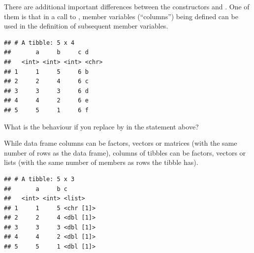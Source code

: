 \documentclass[krantz2]{krantz}\usepackage{knitr}%
\begin{document}
There are additional important differences between the constructors  and . One of them is that in a call to , member variables (``columns'')  being defined can be used in the definition of subsequent member variables.
\begin{knitrout}\footnotesize
{}\color{fgcolor}\begin{kframe}
\begin{alltt}
\hlstd{(} \hlstd{=} \hlopt{:}\hlstd{,}  \hlstd{=} \hlopt{:}\hlstd{,}   \hlopt{+}   \hlstd{= letters[a} \hlopt{+} \hlstd{])}
\end{alltt}
\begin{verbatim}
## # A tibble: 5 x 4
##       a     b     c d    
##   <int> <int> <int> <chr>
## 1     1     5     6 b    
## 2     2     4     6 c    
## 3     3     3     6 d    
## 4     4     2     6 e    
## 5     5     1     6 f
\end{verbatim}
\end{kframe}
\end{knitrout}

\begin{playground}
What is the behaviour if you replace  by  in the statement above?
\end{playground}

While data frame columns can be factors, vectors or matrices (with the same number of rows as the data frame), columns of tibbles can be factors, vectors or lists (with the same number of members as rows the tibble has).
\begin{knitrout}\footnotesize
{}\color{fgcolor}\begin{kframe}
\begin{alltt}
\hlstd{(} \hlstd{=} \hlopt{:}\hlstd{,}  \hlstd{=} \hlopt{:}\hlstd{,}  \hlstd{=} \hlstd{(}\hlstd{,} \hlstd{,} \hlstd{,} \hlstd{,} \hlstd{))}
\end{alltt}
\begin{verbatim}
## # A tibble: 5 x 3
##       a     b c        
##   <int> <int> <list>   
## 1     1     5 <chr [1]>
## 2     2     4 <dbl [1]>
## 3     3     3 <dbl [1]>
## 4     4     2 <dbl [1]>
## 5     5     1 <dbl [1]>
\end{verbatim}
\end{kframe}
\end{knitrout}
\end{document}
